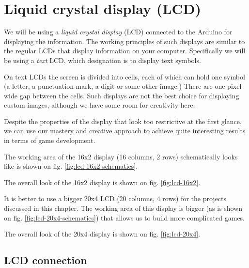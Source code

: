 \documentclass[../sparc.tex]{subfiles}
\begin{document}
\section{Liquid crystal display (LCD)}


We will be using a \emph{liquid crystal display} (LCD) connected to the Arduino
for displaying the information.  The working principles of such displays are
similar to the regular LCDs that display information on your computer.
Specifically we will be using a \emph{text} LCD, which designation is to display
text symbols.

On text LCDs the screen is divided into cells, each of which can hold one symbol
(a letter, a punctuation mark, a digit or some other image.)  There are one
pixel-wide gap between the cells.  Such displays are not the best choice for
displaying custom images, although we have some room for creativity here.

Despite the properties of the display that look too restrictive at the first
glance, we can use our mastery and creative approach to achieve quite
interesting results in terms of game development.

The working area of the 16x2 display (16 columns, 2 rows) schematically looks
like is shown on fig. \ref{fig:lcd-16x2-schematics}.


The overall look of the 16x2 display is shown on fig. \ref{fig:lcd-16x2}.


It is better to use a bigger 20x4 LCD (20 columns, 4 rows) for the projects
discussed in this chapter.  The working area of this display is bigger (as is
shown on fig. \ref{fig:lcd-20x4-schematics}) that allows us to build more
complicated games.


The overall look of the 20x4 display is shown on fig. \ref{fig:lcd-20x4}.


\subsection{LCD connection}
\end{document}
